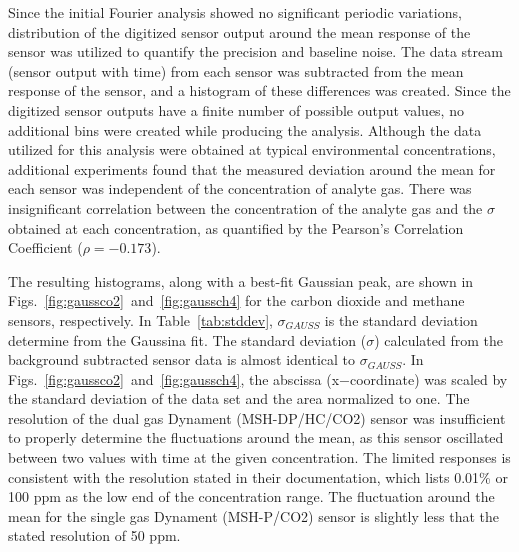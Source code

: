 \documentclass[sensors,article,submit,moreauthors,pdftex]{Definitions/mdpi}
\begin{document}
			Since the initial Fourier analysis showed no significant periodic variations, distribution of the digitized sensor output around the mean response of the sensor was utilized to quantify the precision and baseline noise.
			The data stream (sensor output with time) from each sensor was subtracted from the mean response of the sensor, and a histogram of these differences was created. Since the digitized sensor outputs have a finite number of possible output values, no additional bins were created while producing the analysis.
			Although the data utilized for this analysis were obtained at typical environmental concentrations, additional experiments found that the measured deviation around the mean for each sensor was independent of the concentration of analyte gas.
			There was insignificant correlation between the concentration of the analyte gas and the $\sigma$ obtained at each concentration, as quantified by the Pearson's Correlation Coefficient ($\rho=-0.173$).
			

			The resulting histograms, along with a best-fit Gaussian peak, are shown in Figs.~\ref{fig:gaussco2}~and~\ref{fig:gaussch4} for the carbon dioxide and methane sensors, respectively.
			In Table~\ref{tab:stddev}, $\sigma_{GAUSS}$ is the standard deviation determine from the Gaussina fit.
			The standard deviation ($\sigma$) calculated from the background subtracted sensor data is almost identical to $\sigma_{GAUSS}$.
			In Figs.~\ref{fig:gaussco2}~and~\ref{fig:gaussch4}, the abscissa (x$-$coordinate) was scaled by the standard deviation of the data set and the area normalized to one.
			The resolution of the dual gas Dynament (MSH-DP/HC/CO2) sensor was insufficient to properly determine the fluctuations around the mean, as this sensor oscillated between two values with time at the given concentration.
			The limited responses is consistent with the resolution stated in their documentation, which lists 0.01\% or 100 ppm as the low end of the concentration range.
			The fluctuation around the mean for the single gas Dynament (MSH-P/CO2) sensor is slightly less that the stated resolution of 50 ppm.
			
\end{document}
